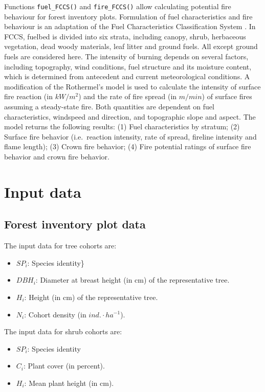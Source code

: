 \documentclass[]{book}
\providecommand{\tightlist}{%
  \setlength{\itemsep}{0pt}\setlength{\parskip}{0pt}}
\begin{document}
Functions \texttt{fuel\_FCCS()} and \texttt{fire\_FCCS()} allow
calculating potential fire behaviour for forest inventory plots.
Formulation of fuel characteristics and fire behaviour is an adaptation
of the Fuel Characteristics Classification System
\citep[FCCS;][]{Prichard2013}. In FCCS, fuelbed is divided into six
strata, including canopy, shrub, herbaceous vegetation, dead woody
materials, leaf litter and ground fuels. All except ground fuels are
considered here. The intensity of burning depends on several factors,
including topography, wind conditions, fuel structure and its moisture
content, which is determined from antecedent and current meteorological
conditions. A modification of the Rothermel's
\citeyearpar{Rothermel1972} model is used to calculate the intensity of
surface fire reaction (in \(kW/m^2\)) and the rate of fire spread (in
\(m/min\)) of surface fires assuming a steady-state fire. Both
quantities are dependent on fuel characteristics, windspeed and
direction, and topographic slope and aspect. The model returns the
following results: (1) Fuel characteristics by stratum; (2) Surface fire
behavior (i.e.~reaction intensity, rate of spread, fireline intensity
and flame length); (3) Crown fire behavior; (4) Fire potential ratings
of surface fire behavior and crown fire behavior.

\section{Input data}\label{input-data-1}

\subsection{Forest inventory plot
data}\label{forest-inventory-plot-data}

The input data for tree cohorts are:

\begin{itemize}
\tightlist
\item
  \(SP_i\): Species identity\}
\item
  \(DBH_i\): Diameter at breast height (in cm) of the representative
  tree.
\item
  \(H_i\): Height (in cm) of the representative tree.
\item
  \(N_i\): Cohort density (in \(ind.\cdot ha^{-1}\)).
\end{itemize}

The input data for shrub cohorts are:

\begin{itemize}
\tightlist
\item
  \(SP_i\): Species identity
\item
  \(C_i\): Plant cover (in percent).
\item
  \(H_i\): Mean plant height (in cm).
\end{itemize}
\end{document}
